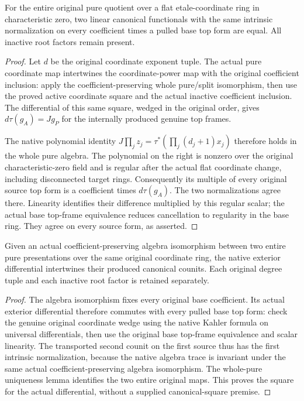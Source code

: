 \begin{lemma}\label{lem:kn-global-trace-whole-pure-uniqueness}
\leanok
For the entire original pure quotient over a flat etale-coordinate ring
in characteristic zero, two linear canonical functionals with the same
intrinsic normalization on every coefficient times a pulled base top
form are equal.  All inactive root factors remain present.
\end{lemma}
\begin{proof}
Let $d$ be the original coordinate exponent tuple.  The actual pure
coordinate map intertwines the coordinate-power map with the original
coefficient inclusion: apply the coefficient-preserving whole pure/split
isomorphism, then use the proved active coordinate square and the actual
inactive coefficient inclusion.  The differential of this same square,
wedged in the original order, gives $d\tau(g_A)=Jg_P$ for the internally
produced genuine top frames.

The native polynomial identity $J\prod_jz_j=\tau^*(\prod_j(d_j+1)x_j)$
therefore holds in the whole pure algebra.  The polynomial on the right
is nonzero over the original characteristic-zero field and is regular
after the actual flat coordinate change, including disconnected target
rings.  Consequently its multiple of every original source top form is
a coefficient times $d\tau(g_A)$.  The two normalizations agree there.
Linearity identifies their difference multiplied by this regular scalar;
the actual base top-frame equivalence reduces cancellation to regularity
in the base ring.  They agree on every source form, as asserted.
\end{proof}

\begin{lemma}\label{lem:kn-global-trace-whole-pure-cross-chart}
Given an actual coefficient-preserving algebra isomorphism between two
entire pure presentations over the same original coordinate ring, the
native exterior differential intertwines their produced canonical
counits.  Each original degree tuple and each inactive root factor is
retained separately.
\end{lemma}
\begin{proof}
The algebra isomorphism fixes every original base coefficient.  Its
actual exterior differential therefore commutes with every pulled base
top form: check the genuine original coordinate wedge using the native
Kahler formula on universal differentials, then use the original base
top-frame equivalence and scalar linearity.  The transported second
counit on the first source thus has the first intrinsic normalization,
because the native algebra trace is invariant under the same actual
coefficient-preserving algebra isomorphism.  The whole-pure uniqueness
lemma identifies the two entire original maps.  This proves the square
for the actual differential, without a supplied canonical-square premise.
\end{proof}

